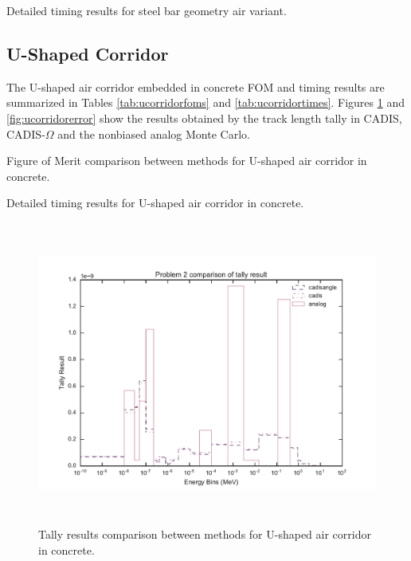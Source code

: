 \begin{table}[h!]
  \centering
  
  \caption[Detailed timing results for steel bar geometry air variant.]
  {Detailed timing results for steel bar geometry air variant.}
  \label{tab:airbeamtimes}
\end{table}

\subsection{U-Shaped Corridor}
\label{subsec:resultsucorridor}

The U-shaped air corridor embedded in concrete
FOM and timing
results are summarized in Tables
\ref{tab:ucorridorfoms} and \ref{tab:ucorridortimes}. Figures
\ref{fig:ucorridorresult} and \ref{fig:ucorridorerror} show the results obtained
by the track length tally in CADIS, CADIS-$\Omega$ and the nonbiased analog
Monte Carlo.

\begin{table}[h!]
  \centering
  
  \caption[Figure of Merit comparison between methods for U-shaped air corridor in concrete.]
  {Figure of Merit comparison between methods for U-shaped air corridor in
  concrete.}
  \label{tab:ucorridorfoms}
\end{table}

\begin{table}[h!]
  \centering
  
  \caption[Detailed timing results for U-shaped air corridor in concrete.]
  {Detailed timing results for U-shaped air corridor in concrete.}
  \label{tab:ucorridortimes}
\end{table}

\begin{figure}[h!]
  \centering
  \includegraphics[height=10cm]{./chapters/characterization_probs/figures/char/prob_2/problem_2_tally_result_compare.pdf}
  \caption[Tally results comparison between methods for U-shaped air corridor in
  concrete.]
  {Tally results comparison between methods for U-shaped air corridor in
  concrete.}
  \label{fig:ucorridorresult}
\end{figure}

